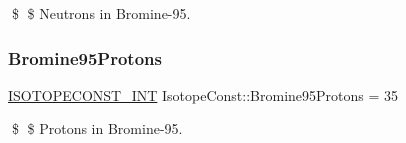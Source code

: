 \$ \$ Neutrons in Bromine-\/95. \mbox{\label{group___isotope_const-_bromine-_br95_gadb331379745bab0426c8a21eb660d2db}} 
\subsubsection{\texorpdfstring{Bromine95\+Protons}{Bromine95Protons}}
{\footnotesize\ttfamily \mbox{\hyperlink{group___isotope_const-_macros_ga5f18360b3e99483a35c32d789e62621c}{I\+S\+O\+T\+O\+P\+E\+C\+O\+N\+S\+T\+\_\+\+I\+NT}} Isotope\+Const\+::\+Bromine95\+Protons = 35}

\$ \$ Protons in Bromine-\/95. 